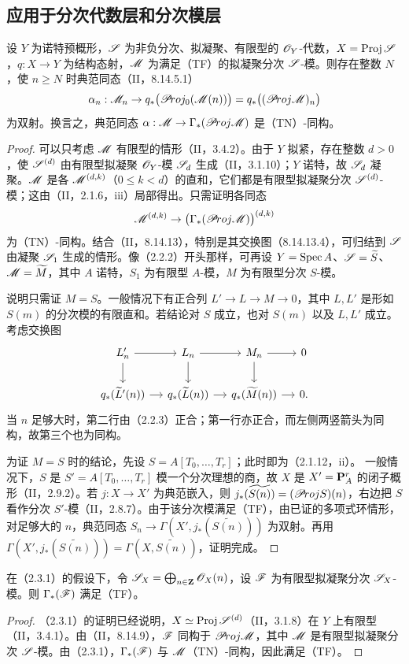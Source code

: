 \subsection{应用于分次代数层和分次模层}
设 $Y$ 为诺特预概形，$\mathscr S$ 为非负分次、拟凝聚、有限型的 $\mathscr O_Y$-代数，$X=\operatorname{Proj}\mathscr S$，$q:X\to Y$ 为结构态射，$\mathscr M$ 为满足（TF）的拟凝聚分次 $\mathscr S$-模。则存在整数 $N$，使 $n\geq N$ 时典范同态（II，8.14.5.1）
\[
\alpha_n:\mathscr M_n\to q_*\bigl(\mathscr{P}\!roj_0(\mathscr M(n))\bigr)
=q_*\bigl((\mathscr{P}\!roj\mathscr M)_n\bigr)
\]
为双射。换言之，典范同态 $\alpha:\mathscr M\to\Gamma_*(\mathscr{P}\!roj\mathscr M)$ 是（TN）-同构。
\begin{proof}
可以只考虑 $\mathscr M$ 有限型的情形（II，3.4.2）。由于 $Y$ 拟紧，存在整数 $d>0$，使 $\mathscr S^{(d)}$ 由有限型拟凝聚 $\mathscr O_Y$-模 $\mathscr S_d$ 生成（II，3.1.10）；$Y$ 诺特，故 $\mathscr S_d$ 凝聚。$\mathscr M$ 是各 $\mathscr M^{(d,k)}$（$0\leq k<d$）的直和，它们都是有限型拟凝聚分次 $\mathscr S^{(d)}$-模；这由（II，2.1.6，iii）局部得出。只需证明各同态
\[
\mathscr M^{(d,k)}\to\bigl(\Gamma_*(\mathscr{P}\!roj\mathscr M)\bigr)^{(d,k)}
\]
为（TN）-同构。结合（II，8.14.13），特别是其交换图（8.14.13.4），可归结到 $\mathscr S$ 由凝聚 $\mathscr S_1$ 生成的情形。像（2.2.2）开头那样，可再设 $Y=\operatorname{Spec} A$、$\mathscr S=\widetilde{S}$、$\mathscr M=\widetilde{M}$，其中 $A$ 诺特，$S_1$ 为有限型 $A$-模，$M$ 为有限型分次 $S$-模。

说明只需证 $M=S$。一般情况下有正合列 $L'\to L\to M\to0$，其中 $L,L'$ 是形如 $S(m)$ 的分次模的有限直和。若结论对 $S$ 成立，也对 $S(m)$ 以及 $L,L'$ 成立。考虑交换图
\[
\begin{tikzcd}[column sep=small]
L'_n\arrow[r]\arrow[d]&L_n\arrow[r]\arrow[d]&M_n\arrow[r]\arrow[d]&0\\
q_*(\wt L'(n))\arrow[r]&q_*(\wt L(n))\arrow[r]&q_*(\wt M(n))\arrow[r]&0.
\end{tikzcd}
\]
当 $n$ 足够大时，第二行由（2.2.3）正合；第一行亦正合，而左侧两竖箭头为同构，故第三个也为同构。

为证 $M=S$ 时的结论，先设 $S=A[T_0,\ldots,T_r]$；此时即为（2.1.12，ii）。
一般情况下，$S$ 是 $S'=A[T_0,\ldots,T_r]$ 模一个分次理想的商，故 $X$ 是 $X'=\mathbf P_A^r$ 的闭子概形（II，2.9.2）。若 $j:X\to X'$ 为典范嵌入，则 $j_*(\widetilde{S(n)})=(\mathscr{P}\!roj S)(n)$，右边把 $S$ 看作分次 $S'$-模（II，2.8.7）。由于该分次模满足（TF），由已证的多项式环情形，对足够大的 $n$，典范同态
$S_n\to\Gamma(X',j_*(\widetilde{S(n)}))$ 为双射。再用
$\Gamma(X',j_*(\widetilde{S(n)}))=\Gamma(X,\widetilde{S(n)})$，证明完成。
\end{proof}

在（2.3.1）的假设下，令 $\mathscr S_X=\bigoplus_{n\in\mathbf Z}\mathscr O_X(n)$，设 $\mathscr F$ 为有限型拟凝聚分次 $\mathscr S_X$-模。则 $\Gamma_*(\mathscr F)$ 满足（TF）。
\begin{proof}
（2.3.1）的证明已经说明，$X\simeq\operatorname{Proj}\mathscr S^{(d)}$（II，3.1.8）在 $Y$ 上有限型（II，3.4.1）。由（II，8.14.9），$\mathscr F$ 同构于 $\mathscr{P}\!roj\mathscr M$，其中 $\mathscr M$ 是有限型拟凝聚分次 $\mathscr S$-模。由（2.3.1），$\Gamma_*(\mathscr F)$ 与 $\mathscr M$（TN）-同构，因此满足（TF）。
\end{proof}

